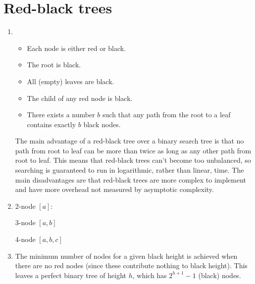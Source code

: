 \documentclass[11pt]{article}
\begin{document}
\section{Red-black trees}
\begin{enumerate}
\item
  \begin{itemize}
  \item Each node is either red or black.
  \item The root is black.
  \item All (empty) leaves are black.
  \item The child of any red node is black.
  \item There exists a number \(b\) such that any path from the root to a leaf contains exactly \(b\) black nodes.
  \end{itemize}
  The main advantage of a red-black tree over a binary search tree is that no path from root to leaf can be more than twice as long as any other path from root to leaf. This means that red-black trees can't become too unbalanced, so searching is guaranteed to run in logarithmic, rather than linear, time. The main disadvantages are that red-black trees are more complex to implement and have more overhead not measured by asymptotic complexity.
\item
  2-node \([a]\):


  3-node \([a,b]\)


  4-node \([a,b,c]\)

\item
  The minimum number of nodes for a given black height is achieved when there are no red nodes (since these contribute nothing to black height). This leaves a perfect binary tree of height \(h\), which has \(2^{h+1}-1\) (black) nodes.


\end{enumerate}
\end{document}
